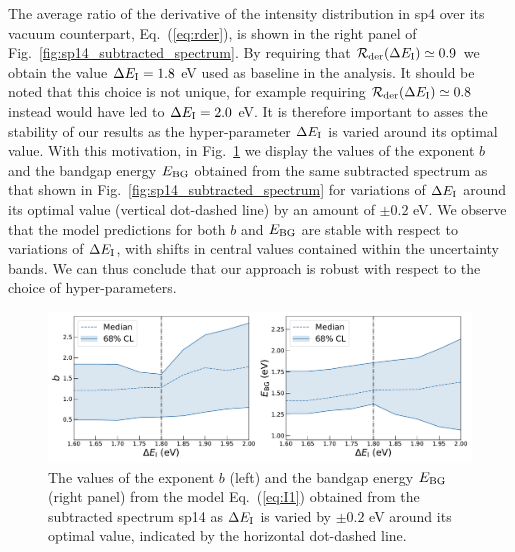 The average ratio of the derivative of the intensity
distribution in sp4 over its vacuum counterpart, Eq.~(\ref{eq:rder}), is shown
in the right panel of  Fig.~\ref{fig:sp14_subtracted_spectrum}. 
%
By requiring that $\mathcal{R}_{\rm der}(\Delta E_{\rm I})\simeq 0.9$ we obtain
the value $\Delta E_{\rm I}=1.8$ eV used as baseline in the analysis.
%
It should be noted that this choice is not unique, for example requiring
$\mathcal{R}_{\rm der}(\Delta E_{\rm I})\simeq 0.8$ instead would have led
to $\Delta E_{\rm I}=2.0$ eV.
%
It is therefore important to asses the stability of our results as the hyper-parameter $\Delta E_{\rm I}$
is varied around its optimal value.
%
With this motivation, in Fig.~\ref{fig:bvalues_sampleA} we display the
values of the exponent $b$
and the bandgap energy $E_{\rm BG}$ 
obtained from the same subtracted spectrum as that shown in
Fig.~\ref{fig:sp14_subtracted_spectrum} for variations of $\Delta E_{\rm I}$ 
around its optimal value (vertical dot-dashed line) by an amount
of $\pm 0.2$ eV.
%
We observe that the model predictions for both $b$ and $E_{\rm BG}$ are stable with respect
to variations of $\Delta E_{\rm I}$, with shifts in central values contained within the
uncertainty bands.
%
We can thus conclude that our approach is robust with respect to the choice of
hyper-parameters.

\begin{figure}[t]
\begin{centering}
  \includegraphics[width=0.99\linewidth]{plots/Stability_plots_sp14.pdf} 
  \caption{\small The values of the exponent $b$ (left)
    and the bandgap energy $E_{\rm BG}$ (right panel) from the model Eq.~(\ref{eq:I1})
    obtained from the subtracted spectrum sp14 as $\Delta E_{\rm I}$ is varied by $\pm 0.2$ eV
    around its optimal value, indicated by the horizontal dot-dashed line.
  }
\label{fig:bvalues_sampleA}
\end{centering}
\end{figure}

